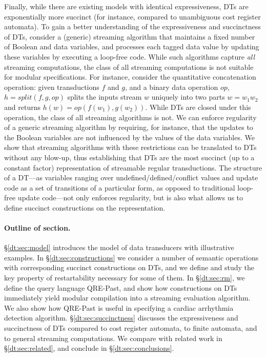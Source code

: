 Finally, while there are existing models
with identical expressiveness, DTs are exponentially more succinct (for instance, compared
to unambiguous cost register automata). To gain a better understanding of the
expressiveness and succinctness of DTs,
consider a (generic) streaming algorithm that maintains a fixed number of Boolean and data
variables, and processes each tagged data value by updating these variables by executing a loop-free
code. While such algorithms capture \emph{all} streaming computations, the class of all streaming
computations is not suitable for modular specifications.
For instance, consider the quantitative concatenation operation:
given transductions $f$ and $g$, and a binary data operation ${\textit{op}}$,
$h={\textit{split}}(f,g,{\textit{op}})$ splits the inputs stream $w$ uniquely into two parts $w=w_1w_2$ and
returns $h(w)={\textit{op}}(f(w_1),g(w_2))$.
While DTs are closed under this operation, the class
of all streaming algorithms is not.
We can enforce regularity of a generic streaming algorithm by requiring, for instance, that the updates to the Boolean
variables are not influenced by the values of the data variables. We show that streaming algorithms
with these restrictions can be translated to DTs without any blow-up, thus establishing that
DTs are the most succinct (up to a constant factor) representation of streamable regular transductions.
The structure of a DT---as variables ranging over undefined/defined/conflict values and update code as a set
of transitions of a particular form, as opposed to traditional loop-free update code---not only enforces regularity, but is also what allows us to define succinct constructions
on the representation.

\paragraph*{Outline of section.}
\S\ref{dt:sec:model} introduces the model of data transducers with illustrative examples.
In \S\ref{dt:sec:constructions} we consider a number of semantic operations with
corresponding succinct constructions on DTs, and we define and study the key property of restartability
necessary for some of them.
In \S\ref{dt:sec:rm}, we define the query language QRE-Past, and show how constructions on DTs
immediately yield modular compilation into a streaming evaluation algorithm.
We also show how QRE-Past is useful in specifying a cardiac arrhythmia
detection algorithm. %
\S\ref{dt:sec:succinctness} discusses the expressiveness and succinctness of DTs compared to cost register automata, to finite automata, and to general streaming computations. We compare with related work in
\S\ref{dt:sec:related}, and conclude in \S\ref{dt:sec:conclusions}.

